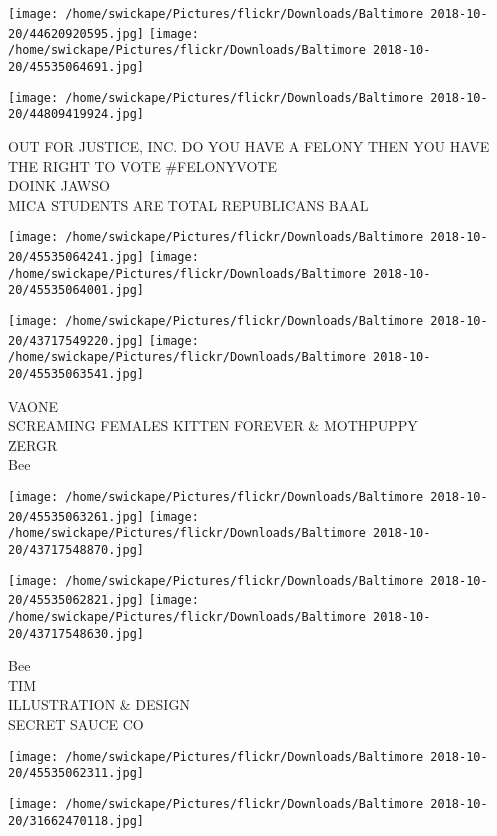 \documentclass[10pt,letterpaper]{article}
\begin{document}
\texttt{[image: /home/swickape/Pictures/flickr/Downloads/Baltimore 2018-10-20/44620920595.jpg]}
\texttt{[image: /home/swickape/Pictures/flickr/Downloads/Baltimore 2018-10-20/45535064691.jpg]}

\vspace{0.25in}
\texttt{[image: /home/swickape/Pictures/flickr/Downloads/Baltimore 2018-10-20/44809419924.jpg]}

OUT FOR JUSTICE, INC. DO YOU HAVE A FELONY THEN YOU HAVE THE RIGHT TO VOTE \#FELONYVOTE\\
DOINK JAWSO\\
MICA STUDENTS ARE TOTAL REPUBLICANS BAAL\\
\pagebreak

\texttt{[image: /home/swickape/Pictures/flickr/Downloads/Baltimore 2018-10-20/45535064241.jpg]}
\texttt{[image: /home/swickape/Pictures/flickr/Downloads/Baltimore 2018-10-20/45535064001.jpg]}

\texttt{[image: /home/swickape/Pictures/flickr/Downloads/Baltimore 2018-10-20/43717549220.jpg]}
\texttt{[image: /home/swickape/Pictures/flickr/Downloads/Baltimore 2018-10-20/45535063541.jpg]}

VAONE\\
SCREAMING FEMALES KITTEN FOREVER \& MOTHPUPPY\\
ZERGR\\
Bee\\
\pagebreak

\texttt{[image: /home/swickape/Pictures/flickr/Downloads/Baltimore 2018-10-20/45535063261.jpg]}
\texttt{[image: /home/swickape/Pictures/flickr/Downloads/Baltimore 2018-10-20/43717548870.jpg]}

\texttt{[image: /home/swickape/Pictures/flickr/Downloads/Baltimore 2018-10-20/45535062821.jpg]}
\texttt{[image: /home/swickape/Pictures/flickr/Downloads/Baltimore 2018-10-20/43717548630.jpg]}

Bee\\
TIM\\
ILLUSTRATION \& DESIGN\\
SECRET SAUCE CO\\
\pagebreak

\texttt{[image: /home/swickape/Pictures/flickr/Downloads/Baltimore 2018-10-20/45535062311.jpg]}

\vspace{0.25in}
\texttt{[image: /home/swickape/Pictures/flickr/Downloads/Baltimore 2018-10-20/31662470118.jpg]}
\end{document}
